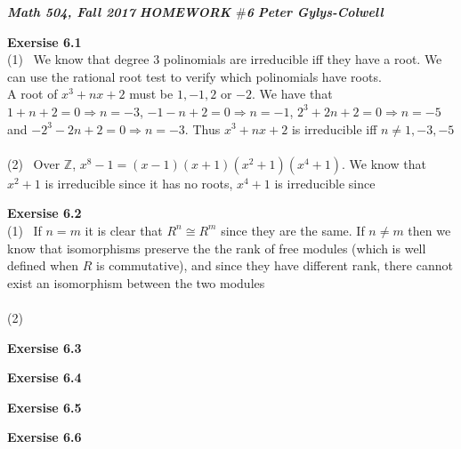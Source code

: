 \documentclass[12pt]{article}
\newenvironment{ques}[1]{\textbf{Exersise #1}\vspace{1 mm}\\ }{\bigskip}
\theoremstyle{definition}
\newcommand{\Z}{\mathbb Z}
\begin{document}
\noindent \textit{\textbf{Math 504, Fall 2017}} \hspace{1.3cm}
\textit{\textbf{HOMEWORK $\#$6}} \hspace{1.3cm} \textit{\textbf{Peter
Gylys-Colwell}} 

\vspace{1cm}

\begin{ques}{6.1}
	(1) \ We know that degree $3$ polinomials are irreducible iff they have a
	root. We can use the rational root test to verify which polinomials have roots.\\
	A root of $x^3 + nx + 2$ must be $1, -1, 2$ or $-2$. We have that $1 + n + 2 =
	0 \Rightarrow n = -3$, $-1 - n + 2 = 0 \Rightarrow n = -1$, $2^3 + 2n + 2
	=0 \Rightarrow n = -5$ and $-2^3 - 2n + 2 = 0 \Rightarrow n = -3$. Thus
	$x^3 + nx + 2$ is irreducible iff $n\neq 1, -3, -5$\\
	\\
	(2) \ Over $\Z$, $x^8 - 1 = (x-1)(x + 1)(x^2 + 1)(x^4 + 1)$. We know that
	$x^2 + 1$ is irreducible since it has no roots, $x^4 + 1$ is irreducible since
\end{ques}

\begin{ques}{6.2}
	(1) \ If $n = m$ it is clear that $R^n \cong R^m$ since they are the same.
	If $n \neq m$ then we know that isomorphisms preserve the the rank of free
	modules (which is well defined when $R$ is commutative), and since they
	have different rank, there cannot exist an isomorphism between the two
	modules\\
	\\
	(2) \ 
\end{ques}

\begin{ques}{6.3}
\end{ques}

\begin{ques}{6.4}
\end{ques}

\begin{ques}{6.5}
\end{ques}

\begin{ques}{6.6}
\end{ques}
\end{document}
